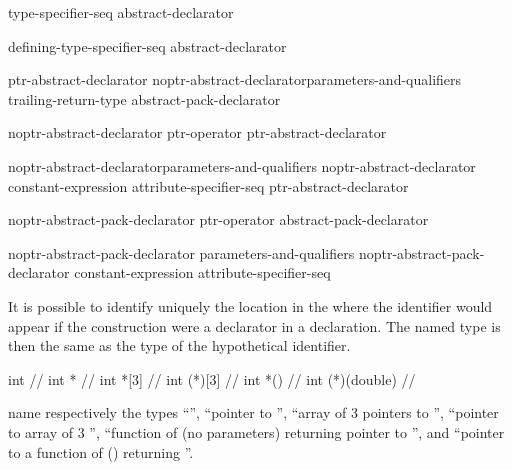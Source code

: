 \begin{bnf}
\br
    type-specifier-seq abstract-declarator\opt
\end{bnf}

\begin{bnf}
\br
    defining-type-specifier-seq abstract-declarator\opt
\end{bnf}

\begin{bnf}
\br
    ptr-abstract-declarator\br
    noptr-abstract-declarator\opt parameters-and-qualifiers trailing-return-type\br
    abstract-pack-declarator
\end{bnf}

\begin{bnf}
\br
    noptr-abstract-declarator\br
    ptr-operator ptr-abstract-declarator\opt
\end{bnf}

\begin{bnf}
\br
    noptr-abstract-declarator\opt parameters-and-qualifiers\br
    noptr-abstract-declarator\opt{} \terminal{[} constant-expression\opt{} \terminal{]} attribute-specifier-seq\opt\br
    \terminal{(} ptr-abstract-declarator \terminal{)}
\end{bnf}

\begin{bnf}
\br
    noptr-abstract-pack-declarator\br
    ptr-operator abstract-pack-declarator
\end{bnf}

\begin{bnf}
\br
    noptr-abstract-pack-declarator parameters-and-qualifiers\br
    noptr-abstract-pack-declarator \terminal{[} constant-expression\opt{} \terminal{]} attribute-specifier-seq\opt\br
\end{bnf}

It is possible to identify uniquely the location in the
where the identifier would appear if the construction were a declarator
in a declaration.
The named type is then the same as the type of the
hypothetical identifier.
\begin{example}

%
%
\begin{codeblock}
int                 // 
int *               // 
int *[3]            // 
int (*)[3]          // 
int *()             // 
int (*)(double)     // 
\end{codeblock}

name respectively the types
``'',
``pointer to
'',
``array of 3 pointers to
'',
``pointer to array of 3
'',
``function of (no parameters) returning pointer to
'',
and ``pointer to a function of
()
returning
''.
\end{example}

